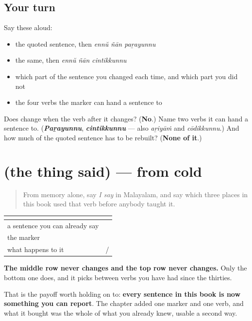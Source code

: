 \subsection*{Your turn}
Say these aloud:

\begin{itemize}
\raggedright
  \item the quoted sentence, then \emph{ennŭ ñān paṟayunnu}
  \item the same, then \emph{ennŭ ñān cintikkunnu}
  \item which part of the sentence you changed each time, and which part you did not
  \item the four verbs the marker can hand a sentence to
\end{itemize}

\begin{tcolorbox}[breakable,colback=teal!4,colframe=teal!35!black,title={Before you move on}]
Does \textbf{} change when the verb after it changes? (\textbf{No}.) Name two verbs it can hand a sentence to. (\emph{\textbf{Paṟayunnu}}, \emph{\textbf{cintikkunnu}} — also \emph{aṟiyāṁ} and \emph{cōdikkunnu}.) And how much of the quoted sentence has to be rebuilt? (\textbf{None of it}.)
\end{tcolorbox}
\section[(the thing said)]{(the thing said) — from cold}

\label{lesson:ML-R72-ennu-recall}



\begin{quote}
From memory alone, say \emph{I say} in Malayalam, and say which three places in this book used that verb before anybody taught it.
\end{quote}

\begin{grammarlens}[title={Grammar Lens: three pieces, in this order}]
\noindent
\begin{tabularx}{\linewidth}{@{}>{\raggedright\arraybackslash}X>{\raggedright\arraybackslash}X@{}}
\toprule
\textbf{} & \textbf{} \\
\midrule
a sentence you can already say & \textbf{\ml{എനിക്ക്} \ml{മലയാളം} \ml{അറിയാം}} \\
the marker & \textbf{\ml{എന്ന്}} \\
what happens to it & \textbf{\ml{ഞാൻ} \ml{പറയുന്നു}} / \textbf{\ml{ചിന്തിക്കുന്നു}} \\
\bottomrule
\end{tabularx}

\textbf{The middle row never changes and the top row never changes.} Only the bottom one does, and it picks between verbs you have had since the thirties.

That is the payoff worth holding on to: \textbf{every sentence in this book is now something you can report}. The chapter added one marker and one verb, and what it bought was the whole of what you already knew, usable a second way.
\end{grammarlens}

